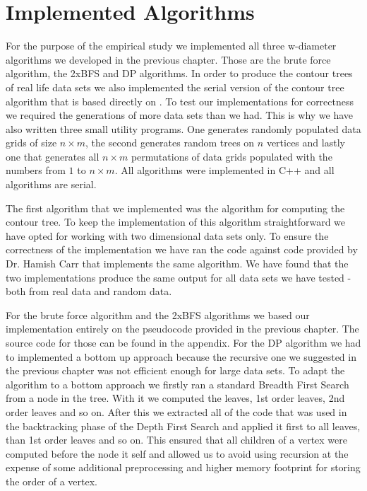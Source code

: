 \section{Implemented Algorithms}

For the purpose of the empirical study we implemented all three w-diameter algorithms we developed in the previous chapter. Those are the brute force algorithm, the 2xBFS and DP algorithms. In order to produce the contour trees of real life data sets we also implemented the serial version of the contour tree algorithm that is based directly on \cite{carr-masters}. To test our implementations for correctness we required the generations of more data sets than we had. This is why we have also written three small utility programs. One generates randomly populated data grids of size $n \times m$, the second generates random trees on $n$ vertices and lastly one that generates all $n \times m$ permutations of data grids populated with the numbers from $1$ to $n \times m$.  All algorithms were implemented in C++ and all algorithms are serial.

The first algorithm that we implemented was the algorithm for computing the contour tree. To keep the implementation of this algorithm straightforward we have opted for working with two dimensional data sets only. To ensure the correctness of the implementation we have ran the code against code provided by Dr. Hamish Carr that implements the same algorithm. We have found that the two implementations produce the same output for all data sets we have tested - both from real data and random data.

For the brute force algorithm and the 2xBFS algorithms we based our implementation entirely on the pseudocode provided in the previous chapter. The source code for those can be found in the appendix. For the DP algorithm we had to implemented a bottom up approach because the recursive one we suggested in the previous chapter was not efficient enough for large data sets. To adapt the algorithm to a bottom approach we firstly ran a standard Breadth First Search from a node in the tree. With it we computed the leaves, 1st order leaves, 2nd order leaves and so on. After this we extracted all of the code that was used in the backtracking phase of the Depth First Search and applied it first to all leaves, than 1st order leaves and so on. This ensured that all children of a vertex were computed before the node it self and allowed us to avoid using recursion at the expense of some additional preprocessing and higher memory footprint for storing the order of a vertex.

